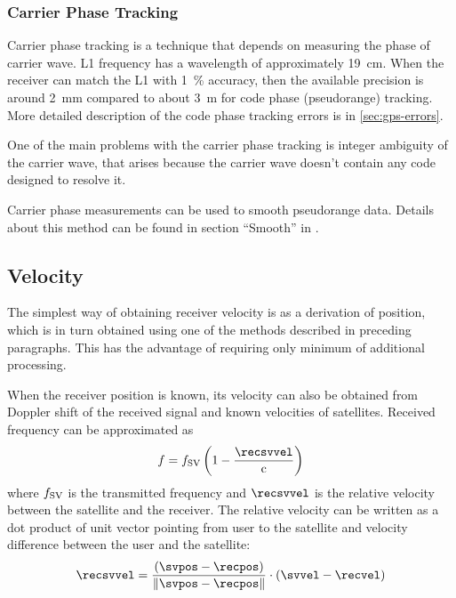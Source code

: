 \subsubsection{Carrier Phase Tracking}
\label{sec:gps_carrier_phase}

Carrier phase tracking is a technique that depends on measuring the phase of carrier wave.
L1 frequency has a wavelength of approximately \SI{19}{\centi\meter}.
When the receiver can match the L1 with \SI{1}{\percent} accuracy, then the available precision
is around \SI{2}{\milli\meter} compared to about \SI{3}{\meter} for code phase (pseudorange)
tracking. More detailed description of the code phase tracking errors is in \autoref{sec:gps-errors}.

One of the main problems with the carrier phase tracking is integer ambiguity of the carrier wave,
that arises because the carrier wave doesn't contain any code designed to resolve it.

Carrier phase measurements can be used to smooth pseudorange data.
Details about this method can be found in section \enquote{Smooth} in \cite{sam-www}.

\subsection{Velocity}
The simplest way of obtaining receiver velocity is as a derivation of
position, which is in turn obtained using one of the methods described in preceding paragraphs.
This has the advantage of requiring only minimum of additional processing.

When the receiver position is known, its velocity can also be obtained from Doppler shift of
the received signal and known velocities of satellites.
Received frequency can be approximated as
\begin{equation}
	f = f_\SV \left(1 - \frac{\recsvvel}{\speedoflight}\right)
	\label{eq:doppler}
\end{equation}
where \(f_{\mathrm{SV}}\) is the transmitted frequency and \(\recsvvel\) is the relative velocity
between the satellite and the receiver.
The relative velocity can be written as a dot product of unit vector pointing
from user to the satellite and velocity difference between the user and the satellite:
\begin{equation}
	\recsvvel = \frac{
		(\svpos - \recpos)
	}{
		\norm{\svpos - \recpos}
	} \cdot (\svvel - \recvel)
	\label{eq:doppler-velocity}
\end{equation}

